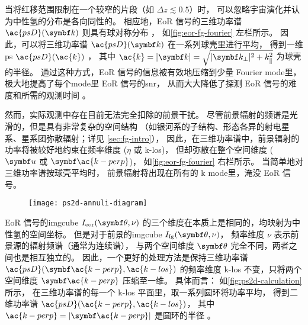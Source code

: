 当将红移范围限制在一个较窄的片段（如 $\Delta z \lesssim 0.5$）时，
可以忽略宇宙演化并认为中性氢的分布是各向同性的。
相应地，EoR 信号的三维功率谱 $\ac{psD}(\B{k})$ 则具有球对称分布
\cite{morales2004,mcQuinn2006}，
如\autoref{fig:eor-fg-fourier} 左栏所示。
因此，可以将三维功率谱 $\ac{psD}(\B{k})$ 在一系列球壳里进行平均，
得到一维\ac{ps} $\ac{psD}(\ac{k})$ \cite{morales2004,datta2010}，
其中 $\ac{k} = |\B{k}| = \sqrt{|\B{k}_{\perp}|^2 + k_{\parallel}^2}$
为球壳的半径。
通过这种方式，EoR 信号的信息被有效地压缩到少量 Fourier \ac{mode}里，
极大地提高了每个\ac{mode}里 EoR 信号的\ac{snr}，
从而大大降低了探测 EoR 信号的难度和所需的观测时间 \cite{datta2010}。

然而，实际观测中存在目前无法完全扣除的前景干扰。
尽管前景辐射的频谱是光滑的，但是具有非常复杂的空间结构
（如银河系的子结构、形态各异的射电星系、星系团弥散辐射；详见 \autoref{sec:fg-intro}），
因此，在三维功率谱中，前景辐射的功率将被较好地约束在频率维度
($\eta$ 或 \ac{k-los})，
但却弥散在整个空间维度 ($\B{u}$ 或 $\B{\ac{k-perp}}$)，
如\autoref{fig:eor-fg-fourier} 右栏所示。
当简单地对三维功率谱按球壳平均时，
前景辐射将出现在所有的 \ac{k} \ac{mode}里，淹没 EoR 信号。

\begin{figure}[htp]
  \centering
  \texttt{[image: ps2d-annuli-diagram]}
  \label{fig:ps2d-calculation}
\end{figure}

EoR 信号的\ac{imgcube} $I_{\R{eor}}(\B{\theta}, \nu)$
的三个维度在本质上是相同的，均映射为中性氢的空间坐标。
但是对于前景的\ac{imgcube} $I_{\R{fg}}(\B{\theta}, \nu)$，
频率维度 $\nu$ 表示前景源的辐射频谱（通常为连续谱），
与两个空间维度 $\B{\theta}$ 完全不同，两者之间也是相互独立的。
因此，一个更好的处理方法是保持三维功率谱 $\ac{psD}(\B{\ac{k-perp}}, \ac{k-los})$
的频率维度 \ac{k-los} 不变，只将两个空间维度 $\B{\ac{k-perp}}$ 压缩至一维。
具体而言：
如\autoref{fig:ps2d-calculation} 所示，
在三维功率谱的每一个 \ac{k-los} 平面里，取一系列圆环将功率平均，
得到二维功率谱 $\ac{psD}(\ac{k-perp}, \ac{k-los})$，
其中 $\ac{k-perp} = |\B{\ac{k-perp}}|$ 是圆环的半径
\cite{datta2010,thyagarajan2013}。

